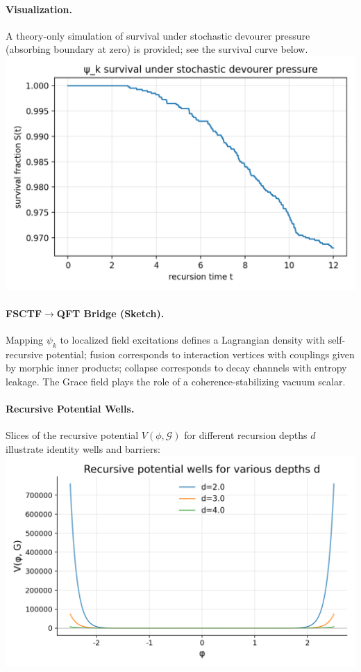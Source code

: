 \paragraph{Visualization.} A theory-only simulation of survival under stochastic
devourer pressure (absorbing boundary at zero) is provided; see the survival
curve below.
\\
\noindent\includegraphics[width=0.75\linewidth]{figures/morphic_survival_curve.png}

\paragraph{FSCTF$\to$QFT Bridge (Sketch).} Mapping $\psi_k$ to localized field
excitations defines a Lagrangian density with self-recursive potential;
fusion corresponds to interaction vertices with couplings given by morphic
inner products; collapse corresponds to decay channels with entropy leakage.
The Grace field plays the role of a coherence-stabilizing vacuum scalar.

\paragraph{Recursive Potential Wells.} Slices of the recursive potential $V(\phi,\mathcal G)$
for different recursion depths $d$ illustrate identity wells and barriers:
\\
\noindent\includegraphics[width=0.85\linewidth]{figures/recursive_potential_wells.png}



